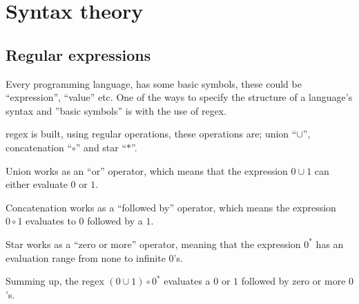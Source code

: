 \pagebreak
\section{Syntax theory}
\subsection{Regular expressions}
Every programming language, has some basic symbols, these could be ``expression'', ``value'' etc. %
One of the ways to specify the structure of a language's syntax and ''basic symbols'' is with the use of \ac{regex}.\cite{Fischer2010}

\ac{regex} is built, using regular operations, these operations are; union ``$\cup$'', concatenation ``$\circ$'' and star ``$\ast$''.
\begin{description}
	\item Union works as an ``or'' operator, which means that the expression $0 \cup 1$ can either evaluate $0$ or $1$.
	\item Concatenation works as a ``followed by'' operator, which means the expression $0 \circ 1$ evaluates to $0$ followed by a $1$.
	\item Star works as a ``zero or more'' operator, meaning that the expression $0^{\ast}$ has an evaluation range from none to infinite $0$'s.
\end{description}
Summing up, the \ac{regex} $(0 \cup 1) \circ 0^{\ast}$ evaluates a $0$ or $1$ followed by zero or more $0$'s. \cite{syntax_book}

